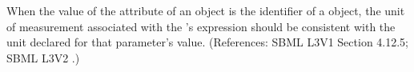When the value of the attribute  of an \EventAssignment
object is the identifier of a \Parameter object, the unit of measurement
associated with the \EventAssignment's  expression should be
consistent with the unit declared for that parameter's value.  (References:
SBML L3V1 Section 4.12.5; SBML L3V2 .)
